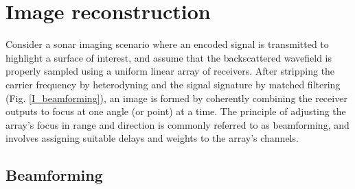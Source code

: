 {%

%





\section{Image reconstruction}\label{methods}

Consider a sonar imaging scenario where an encoded signal is transmitted to highlight a surface of interest, and assume that the backscattered wavefield is properly sampled using a uniform linear array of receivers. After stripping the carrier frequency by heterodyning and the signal signature by  matched filtering (Fig. \ref{I_beamforming}), an image is formed by coherently combining the receiver outputs to focus at one angle (or point) at a time. The principle of adjusting the array's focus in range and direction is commonly referred to as beamforming, and involves assigning suitable delays and weights to the array's channels.


\subsection{Beamforming}

}
